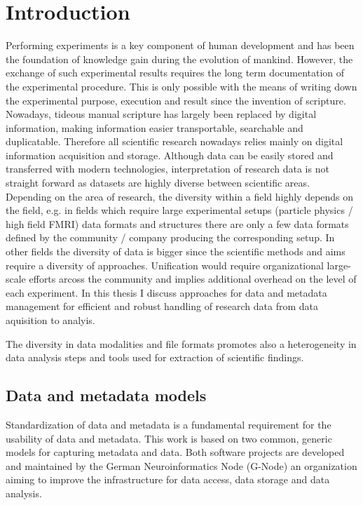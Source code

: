 \clearpage
\chapter{Introduction}
\label{sec:intro}

Performing experiments is a key component of human development and has been the foundation of knowledge gain during the evolution of mankind. However, the exchange of such experimental results requires the long term documentation of the  experimental procedure. This is only possible with the means of writing down the experimental purpose, execution and result since the invention of scripture. Nowadays, tideous manual scripture has largely been replaced by digital information, making information easier transportable, searchable and duplicatable. Therefore all scientific research nowadays relies mainly on digital information acquisition and storage. Although data can be easily stored and transferred with modern technologies, interpretation of research data is not straight forward as datasets are highly diverse between scientific areas. Depending on the area of research, the diversity within a field highly depends on the field, e.g. in fields which require large experimental setups (particle physics / high field FMRI) data formats and structures  there are only a few data formats defined by the community / company producing the corresponding setup. In other fields the diversity of data is bigger since the scientific methods and aims require a diversity of approaches. Unification would require organizational large-scale efforts arcoss the community and implies additional overhead on the level of each experiment. In this thesis I discuss approaches for data and metadata management for efficient and robust handling of research data from data aquisition to analyis.

The diversity in data modalities and file formats promotes also a heterogeneity in data analysis steps and tools used for extraction of scientific findings.




\section{Data and metadata models}
Standardization of data and metadata is a fundamental requirement for the usability of data and metadata. This work is based on two common, generic models for capturing metadata and data. Both software projects are developed and maintained by the German Neuroinformatics Node (G-Node) an organization aiming to improve the infrastructure for data access, data storage and data analysis. 

